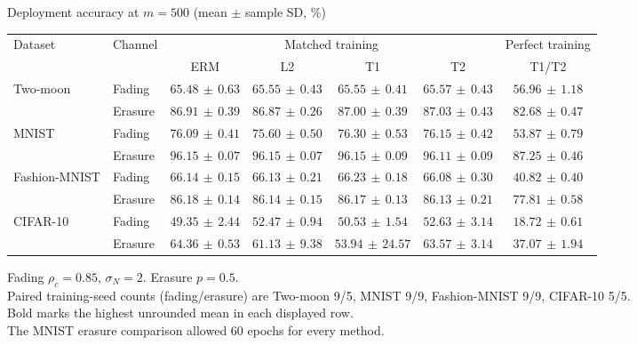 \documentclass[border=4pt]{standalone}
\begin{document}
\begin{minipage}{7.8in}
\centering
Deployment accuracy at $m=500$ (mean $\pm$ sample SD, \%)\\[4pt]
\begin{tabular*}{\linewidth}{@{\extracolsep{\fill}}llccccc@{}}
\toprule
\multirow{2}{*}{Dataset} & \multirow{2}{*}{Channel} & \multicolumn{4}{c}{Matched training} & Perfect training \\
\cmidrule(lr){3-6}\cmidrule(l){7-7}
 & & ERM & L2 & T1 & T2 & T1/T2 \\
\midrule
\multirow{2}{*}{Two-moon} & Fading & $65.48\,\pm\,0.63$ & $65.55\,\pm\,0.43$ & $65.55\,\pm\,0.41$ & $\mathbf{65.57}\,\pm\,0.43$ & $56.96\,\pm\,1.18$ \\
 & Erasure & $86.91\,\pm\,0.39$ & $86.87\,\pm\,0.26$ & $87.00\,\pm\,0.39$ & $\mathbf{87.03}\,\pm\,0.43$ & $82.68\,\pm\,0.47$ \\
\midrule[0.25pt]
\multirow{2}{*}{MNIST} & Fading & $76.09\,\pm\,0.41$ & $75.60\,\pm\,0.50$ & $\mathbf{76.30}\,\pm\,0.53$ & $76.15\,\pm\,0.42$ & $53.87\,\pm\,0.79$ \\
 & Erasure & $\mathbf{96.15}\,\pm\,0.07$ & $96.15\,\pm\,0.07$ & $96.15\,\pm\,0.09$ & $96.11\,\pm\,0.09$ & $87.25\,\pm\,0.46$ \\
\midrule[0.25pt]
\multirow{2}{*}{Fashion-MNIST} & Fading & $66.14\,\pm\,0.15$ & $66.13\,\pm\,0.21$ & $\mathbf{66.23}\,\pm\,0.18$ & $66.08\,\pm\,0.30$ & $40.82\,\pm\,0.40$ \\
 & Erasure & $\mathbf{86.18}\,\pm\,0.14$ & $86.14\,\pm\,0.15$ & $86.17\,\pm\,0.13$ & $86.13\,\pm\,0.21$ & $77.81\,\pm\,0.58$ \\
\midrule[0.25pt]
\multirow{2}{*}{CIFAR-10} & Fading & $49.35\,\pm\,2.44$ & $52.47\,\pm\,0.94$ & $50.53\,\pm\,1.54$ & $\mathbf{52.63}\,\pm\,3.14$ & $18.72\,\pm\,0.61$ \\
 & Erasure & $\mathbf{64.36}\,\pm\,0.53$ & $61.13\,\pm\,9.38$ & $53.94\,\pm\,24.57$ & $63.57\,\pm\,3.14$ & $37.07\,\pm\,1.94$ \\
\bottomrule
\end{tabular*}
\par\smallskip\raggedright\footnotesize
Fading $\rho_c=0.85$, $\sigma_N=2$. Erasure $p=0.5$.\\
Paired training-seed counts (fading/erasure) are Two-moon 9/5, MNIST 9/9, Fashion-MNIST 9/9, CIFAR-10 5/5.\\
Bold marks the highest unrounded mean in each displayed row.\\
The MNIST erasure comparison allowed 60 epochs for every method.
\end{minipage}
\end{document}

